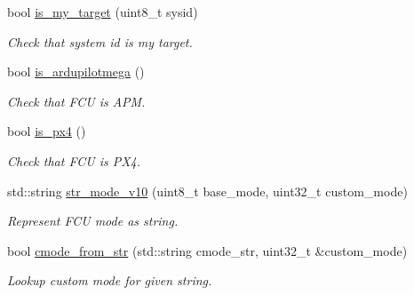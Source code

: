 \begin{DoxyCompactItemize}
bool \mbox{\hyperlink{group__nodelib_gaed7b8a1d25613984a83837958b0dde67}{is\+\_\+my\+\_\+target}} (uint8\+\_\+t sysid)
\begin{DoxyCompactList}\small\item\em Check that system id is my target. \end{DoxyCompactList}\item 
bool \mbox{\hyperlink{group__nodelib_gad1a57410bba40929fd2aa443e8706695}{is\+\_\+ardupilotmega}} ()
\begin{DoxyCompactList}\small\item\em Check that F\+CU is A\+PM. \end{DoxyCompactList}\item 
bool \mbox{\hyperlink{group__nodelib_ga03c6f1128530da35612a7d40eb5cb5ad}{is\+\_\+px4}} ()
\begin{DoxyCompactList}\small\item\em Check that F\+CU is P\+X4. \end{DoxyCompactList}\item 
std\+::string \mbox{\hyperlink{group__nodelib_gaa60e637dbc000f32038c9d8ad58c678a}{str\+\_\+mode\+\_\+v10}} (uint8\+\_\+t base\+\_\+mode, uint32\+\_\+t custom\+\_\+mode)
\begin{DoxyCompactList}\small\item\em Represent F\+CU mode as string. \end{DoxyCompactList}\item 
bool \mbox{\hyperlink{group__nodelib_gaa280a5a875442cf0683860ff5849916a}{cmode\+\_\+from\+\_\+str}} (std\+::string cmode\+\_\+str, uint32\+\_\+t \&custom\+\_\+mode)
\begin{DoxyCompactList}\small\item\em Lookup custom mode for given string. \end{DoxyCompactList}\end{DoxyCompactItemize}
